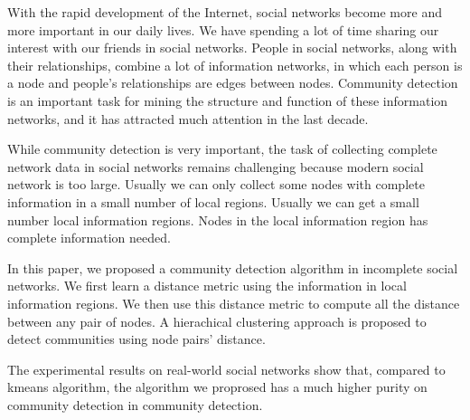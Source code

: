 \begin{englishabstract}
    With the rapid development of the Internet, 
    social networks become more and more important in our daily lives.
    We have spending a lot of time sharing our interest with our friends
    in social networks. People in social networks, along with their relationships,
    combine a lot of information networks, in which each person is a node and people's 
    relationships are edges between nodes. Community detection is an important task
    for mining the structure and function of these information networks, and it has
    attracted much attention in the last decade.

    While community detection is very important, the task of collecting complete network
    data in social networks remains challenging because modern social network is too large.
    Usually we can only collect some nodes with complete information in a small number of local regions. 
    Usually we can get a small number local information regions. 
    Nodes in the local information region has complete information needed.

    In this paper, we proposed a community detection algorithm in incomplete social networks.
    We first learn a distance metric using the information in local information regions.
    We then use this distance metric to compute all the distance between any pair of nodes.
    A hierachical clustering approach is proposed to detect communities using node pairs'
    distance.

    The experimental results on real-world social networks show that, compared to kmeans algorithm, the algorithm 
    we proprosed has a much higher purity on community detection in community detection.

\end{englishabstract}

